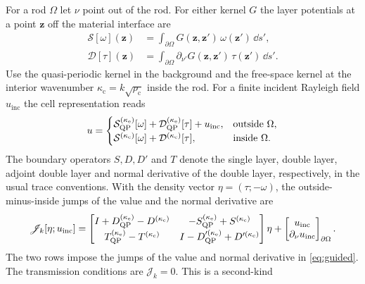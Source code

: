 For a rod $\Omega$ let $\nu$ point out of the rod. For either kernel $G$
the layer potentials at a point $\mathbf z$ off the material interface are
\[
 \begin{aligned}
 \mathcal S[\omega](\mathbf z)&=\int_{\partial\Omega}
       G(\mathbf z,\mathbf z')\,\omega(\mathbf z')\,\dd s',\\
 \mathcal D[\tau](\mathbf z)&=\int_{\partial\Omega}
       \partial_{\nu'}G(\mathbf z,\mathbf z')\,\tau(\mathbf z')\,\dd s'.
 \end{aligned}
\]
Use the quasi-periodic kernel in the background and the free-space kernel
at the interior wavenumber $\kappa_{\mathrm c}=k\sqrt{\rho_{\mathrm c}}$
inside the rod. For a finite incident Rayleigh field $u_{\mathrm{inc}}$ the
cell representation reads
\begin{equation}\label{eq:cell-rep}
 u=\begin{cases}
 \mathcal S_{\mathrm{QP}}^{(\kappa_{\mathrm e})}[\omega]
 +\mathcal D_{\mathrm{QP}}^{(\kappa_{\mathrm e})}[\tau]+u_{\mathrm{inc}},
    &\text{outside }\Omega,\\
 \mathcal S^{(\kappa_{\mathrm c})}[\omega]
 +\mathcal D^{(\kappa_{\mathrm c})}[\tau],
    &\text{inside }\Omega .
 \end{cases}
\end{equation}
The boundary operators $S,D,D'$ and $T$ denote the single layer, double
layer, adjoint double layer and normal derivative of the double layer,
respectively, in the usual trace conventions. With the density vector
$\eta=(\tau;-\omega)$, the outside-minus-inside jumps of the value and the
normal derivative are \cite{ColtonKress1983,Kress1991}
\begin{equation}\label{eq:jump-operator}
  \mathscr J_k[\eta;u_{\mathrm{inc}}]=
  \begin{bmatrix}
    I+D^{(\kappa_{\mathrm e})}_{\mathrm{QP}}-D^{(\kappa_{\mathrm c})}&-S^{(\kappa_{\mathrm e})}_{\mathrm{QP}}+S^{(\kappa_{\mathrm c})}\\[2pt]
    T^{(\kappa_{\mathrm e})}_{\mathrm{QP}}-T^{(\kappa_{\mathrm c})}&I-D'^{(\kappa_{\mathrm e})}_{\mathrm{QP}}+D'^{(\kappa_{\mathrm c})}
  \end{bmatrix}\eta
  +\begin{bmatrix}u_{\mathrm{inc}}\\ \partial_\nu u_{\mathrm{inc}}\end{bmatrix}_{\partial\Omega}.
\end{equation}
The two rows impose the jumps of the value and normal derivative in \eqref{eq:guided}. The transmission conditions are $\mathscr J_k=0$. This is a second-kind
